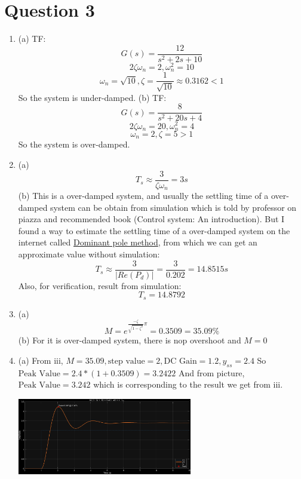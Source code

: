 \documentclass[12pt]{article}
\begin{document}
\section*{Question 3}
    \begin{enumerate}[label=\roman*.]
        \item (a) TF:
        \[G(s) = \frac{12}{s^2+2s+10}\]
        \[2\zeta\omega_n = 2, \omega_n^2 = 10\]
        \[\omega_n = \sqrt{10}, \zeta = \frac{1}{\sqrt{10}} \approx 0.3162 < 1\]
        So the system is under-damped.
        (b) TF:
        \[G(s) = \frac{8}{s^2+20s+4}\]
        \[2\zeta\omega_n = 20, \omega_n^2 = 4\]
        \[\omega_n = 2, \zeta = 5 > 1\]
        So the system is over-damped.

        \item (a)
        \[T_s \approx \frac{3}{\zeta\omega_n} = 3s\]
        (b)
        This is a over-damped system, and usually the settling time of a 
        over-damped system can be obtain from simulation which is told by 
        professor on piazza and recommended book (Control system: 
        An introduction). But I found a way to estimate the settling time of a
        over-damped system on the internet called
        \href{https://electronics.stackexchange.com/questions/511722/
        how-to-estimate-settling-time-of-an-overdamped-system}
        {Dominant pole method}, from which we can get an approximate value
        without simulation:
        \[T_s \approx \frac{3}{|Re(P_d)|} = \frac{3}{0.202} = 14.8515s\]
        Also, for verification, result from simulation:
        \[T_s = 14.8792\]

        \item (a)
        \[M = e^{\frac{-\zeta}{\sqrt{1-\zeta^2}}\pi} = 0.3509 = 35.09\%\]
        (b)
        For it is over-damped system, there is nop overshoot and $M = 0$

        \item (a) From iii, $M = 35.09, \text{step value} = 2, \text{DC Gain}
        =1.2, y_{ss} = 2.4$
        So $\text{Peak Value} = 2.4 * (1+0.3509) = 3.2422$
        And from picture, $\text{Peak Value} = 3.242$ which is corresponding to
        the result we get from iii.
        \begin{center}
            \includegraphics[width=0.6\textwidth]{Q3a.png}
        \end{center}


\end{enumerate}
\end{document}
